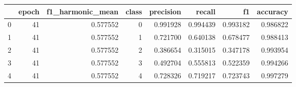 \begin{tabular}{lrrrrrrr}
\toprule
 & epoch & f1_harmonic_mean & class & precision & recall & f1 & accuracy \\
\midrule
0 & 41 & 0.577552 & 0 & 0.991928 & 0.994439 & 0.993182 & 0.986822 \\
1 & 41 & 0.577552 & 1 & 0.721700 & 0.640138 & 0.678477 & 0.988413 \\
2 & 41 & 0.577552 & 2 & 0.386654 & 0.315015 & 0.347178 & 0.993954 \\
3 & 41 & 0.577552 & 3 & 0.492704 & 0.555813 & 0.522359 & 0.994266 \\
4 & 41 & 0.577552 & 4 & 0.728326 & 0.719217 & 0.723743 & 0.997279 \\
\bottomrule
\end{tabular}

